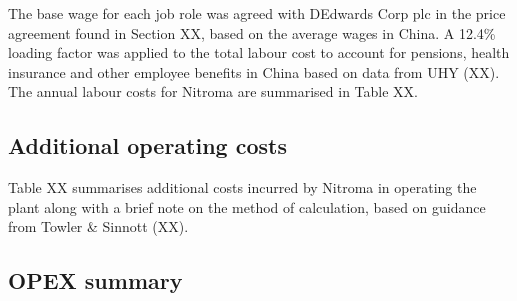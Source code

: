The base wage for each job role was agreed with DEdwards Corp plc in the price agreement found in Section XX, based on the average wages in China. A 12.4\% loading factor was applied to the total labour cost to account for pensions, health insurance and other employee benefits in China based on data from UHY (XX). The annual labour costs for Nitroma are summarised in Table XX.

\subsection{Additional operating costs}
Table XX summarises additional costs incurred by Nitroma in operating the plant along with a brief note on the method of calculation, based on guidance from Towler \& Sinnott (XX).

\subsection{OPEX summary}